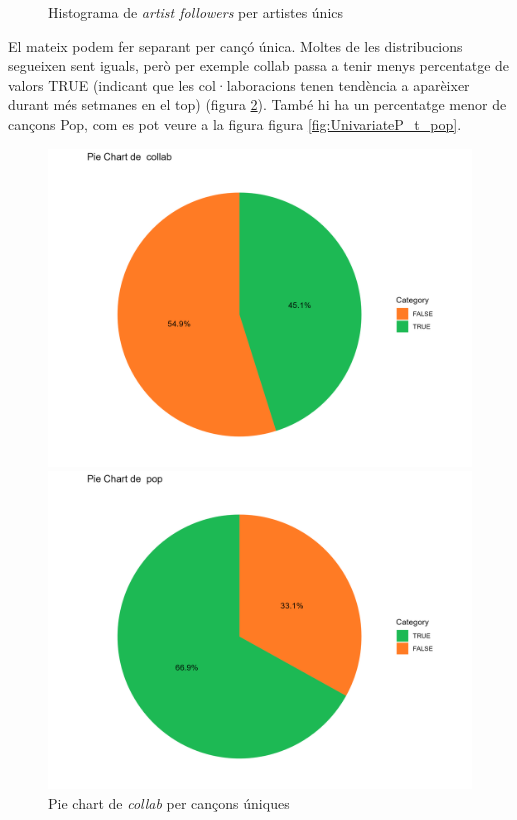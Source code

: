 \begin{figure}[H]
\begin{minipage}{.4\textwidth}
        \caption{Histograma de \textit{artist followers} per artistes únics}
        \label{fig:UnivariateP_a_followers}
    \end{minipage}%
\end{figure}


El mateix podem fer separant per cançó única. Moltes de les distribucions segueixen sent iguals, però per exemple collab passa a tenir menys percentatge de valors TRUE (indicant que les col·laboracions tenen tendència a aparèixer durant més setmanes en el top) (figura \ref{fig:UnivariateP_t_collab}). També hi ha un percentatge menor de cançons Pop, com es pot veure a la figura figura \ref{fig:UnivariateP_t_pop}.

\begin{figure}[H]
\centering
    \begin{minipage}{.4\textwidth}
        \centering
        \includegraphics[width=0.95\linewidth]{Images/3_Preprocessing/Track/pie_collab.png}
        \caption{Pie chart de \textit{collab} per cançons úniques}
        \label{fig:UnivariateP_t_collab}
    \end{minipage}%
    \begin{minipage}{.4\textwidth}
        \centering
        \includegraphics[width=0.95\linewidth]{Images/3_Preprocessing/Track/pie_pop.png}

\end{minipage}
\end{figure}
